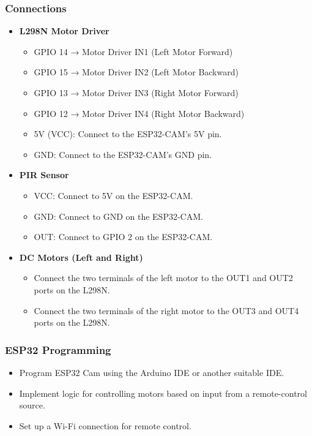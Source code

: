\documentclass[conference]{IEEEtran}
\begin{document}
\subsubsection{\textbf{Connections }}
\begin{itemize}
    \item\textbf{L298N Motor Driver} 
    \begin{itemize}
    \item GPIO 14 → Motor Driver IN1 (Left Motor Forward)
    \item GPIO 15 → Motor Driver IN2 (Left Motor Backward)
    \item GPIO 13 → Motor Driver IN3 (Right Motor Forward)
    \item GPIO 12 → Motor Driver IN4 (Right Motor Backward)
     \item 5V (VCC): Connect to the ESP32-CAM's 5V pin.
     \item GND: Connect to the ESP32-CAM's GND pin.
\end{itemize}
    \item \textbf{PIR Sensor} 
        \begin{itemize}
    \item VCC: Connect to 5V on the ESP32-CAM.
    \item GND: Connect to GND on the ESP32-CAM.
    \item OUT: Connect to GPIO 2 on the ESP32-CAM.
    \end{itemize}
    \item \textbf{DC Motors (Left and Right)} 
\begin{itemize}
        \item Connect the two terminals of the left motor to the OUT1 and OUT2 ports on the L298N.
        \item Connect the two terminals of the right motor to the OUT3 and OUT4 ports on the L298N.
\end{itemize}
\end{itemize}
\subsubsection{\textbf{ESP32 Programming }}
\begin{itemize}
    \item Program ESP32 Cam using the Arduino IDE or another suitable IDE.
    \item Implement logic for controlling motors based on input from a remote-control source.
    \item Set up a Wi-Fi connection for remote control.
\end{itemize}
\end{document}
